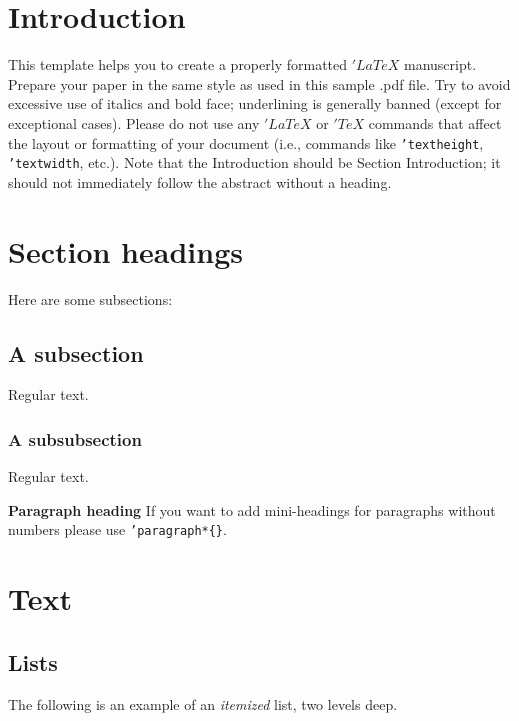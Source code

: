 \documentclass[qe,nameyear,draft]{econsocart}
\theoremstyle{plain}
\begin{document}
\section{Introduction}\label{s1}

This template helps you to create a properly formatted $'LaTeX$ manuscript.
Prepare your paper in the same style as used in this sample .pdf file.
Try to avoid excessive use of italics and bold face; underlining is generally banned (except for exceptional cases). Please do not use any $'LaTeX$ or $'TeX$ commands that affect the layout or formatting of your document (i.e., commands like \texttt{'textheight}, \texttt{'textwidth}, etc.). Note that the Introduction should be Section Introduction; it should not immediately follow the abstract without a heading.

\section{Section headings}

Here are some subsections:

\subsection{A subsection}

Regular text.

\subsubsection{A subsubsection}

Regular text.

\textbf{Paragraph heading}
If you want to add mini-headings for paragraphs without numbers please use \texttt{'paragraph*\{\}}.

\section{Text}

\subsection{Lists}

The following is an example of an \textit{itemized} list,
two levels deep.
\end{document}

